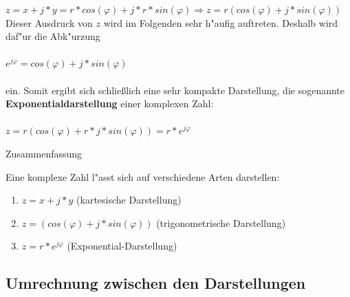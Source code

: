 $z=x+j*y =r*cos(\varphi)+j*r*sin(\varphi) \Rightarrow z=r(cos(\varphi)+j*sin(\varphi))$\\

Dieser Ausdruck von $z$ wird im Folgenden sehr h"aufig auftreten. Deshalb wird daf"ur die Abk"urzung\\
\\
$e^{j\varphi} =cos(\varphi)+j*sin(\varphi)$\\
\\
ein.
Somit ergibt sich schließlich eine sehr kompakte Darstellung, die sogenannte \textbf{Exponentialdarstellung} einer komplexen Zahl:\\\\
$z=  {r(cos(\varphi)+r*j*sin(\varphi))}=r*e^{j\varphi}$

\begin{Bemerkung}
Zusammenfassung\\
\end{Bemerkung}

Eine komplexe Zahl l"asst sich auf verschiedene Arten darstellen:\\


\begin{tcolorbox}

\begin{enumerate}

\item $z=x+j*y$ (kartesische Darstellung)
\item $z=(cos(\varphi)+j*sin(\varphi))$ (trigonometrische Darstellung)
\item $z=r*e^{j\varphi}$ (Exponential-Darstellung)\\

\end{enumerate}

\end{tcolorbox}

	\subsection{Umrechnung zwischen den Darstellungen}
